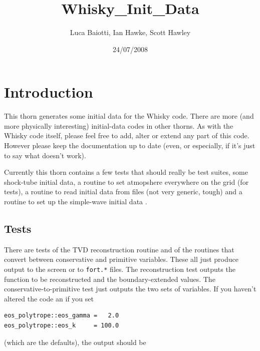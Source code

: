\documentclass{article}
\begin{document}
\title{Whisky\_Init\_Data}
\author{Luca Baiotti, Ian Hawke, Scott Hawley}
\date{24/07/2008}
\maketitle


\section{Introduction}
\label{sec:intro}

This thorn generates some initial data for the Whisky code. There are more (and more physically
interesting) initial-data codes in other thorns. As with the Whisky code itself, please feel free to
add, alter or extend any part of this code. However please keep the documentation up to date (even,
or especially, if it's just to say what doesn't work).

Currently this thorn contains a few tests that should really be test suites, some shock-tube
initial data, 
a routine to set atmopshere everywhere on the
grid (for tests), a routine to read initial data from files (not very generic, tough) and a routine
to set up the simple-wave initial data .


\subsection{Tests}
\label{sec:tests}

There are tests of the TVD reconstruction routine and of the routines
that convert between conservative and primitive variables. These all
just produce output to the screen or to {\tt fort.*} files. The
reconstruction test outputs the function to be reconstructed and the
boundary-extended values. The conservative-to-primitive test just
outputs the two sets of variables. If you haven't altered the code an if you set
\begin{verbatim}
eos_polytrope::eos_gamma =   2.0
eos_polytrope::eos_k     = 100.0
\end{verbatim}
(which are the defaults), the output should be
\end{document}
